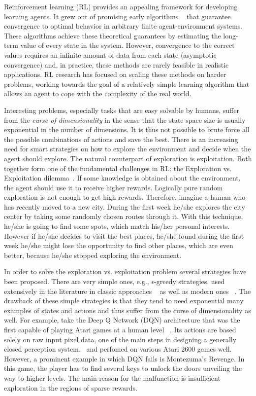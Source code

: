 Reinforcement learning (RL) provides an appealing framework for developing learning agents. It grew out of promising early algorithms ~\cite{Watkins:89,rummery:cuedtr94} that guarantee convergence to optimal behavior in arbitrary finite agent-environment systems. These algorithms achieve these theoretical guarantees by estimating the long-term value of every state in the system. However, convergence to the correct values requires an infinite amount of data from each state (asymptotic convergence) and, in practice, these methods are rarely feasible in realistic applications. RL research has focused on scaling these methods on harder problems, working towards the goal of a relatively simple learning algorithm that allows an agent to cope with the complexity of the real world.\par
Interesting problems, especially tasks that are easy solvable by humans, suffer from the \emph{curse of dimensionality} in the sense that the state space size is usually exponential in the number of dimensions. It is thus not possible to brute force all the possible combinations of actions and save the best. There is an increasing need for smart strategies on how to explore the environment and decide when the agent should explore.
The natural counterpart of exploration is exploitation.  Both together form one of the fundamental challenges in RL: the Exploration vs. Exploitation dilemma~\cite{Sutton:1998:IRL:551283}. If some knowledge is obtained about the environment, the agent should use it to receive higher rewards. Logically pure random exploration is not enough to get high rewards. Therefore, imagine a human who has recently moved to a new city. During the first week he/she explores the city center by taking some randomly chosen routes through it. With this technique, he/she is going to find some spots, which match his/her personal interests. However if he/she decides to visit the best places, he/she found during the first week he/she might lose the opportunity to find other places, which are even better, because he/she stopped exploring the environment.\par
In order to solve the exploration vs. exploitation problem several strategies have been proposed. There are very simple ones, e.g., $\epsilon$-greedy strategies, used extensively in the literature in classic approaches ~\cite{Watkins:89,rummery:cuedtr94} as well as modern ones ~\cite{mnih2015humanlevel,DBLP:journals/corr/OsbandBPR16}. The drawback of these simple strategies is that they tend to need exponential many examples of states and actions and thus suffer from the curse of dimensionality as well. For example, take the Deep Q Network (DQN) architecture that was the first capable of playing Atari games at a human level ~\cite{mnih2015humanlevel}. Its actions are based solely on raw input pixel data, one of the main steps in designing a generally closed perception system.~\cite{mnih2015humanlevel} and perfomed on various Atari 2600 games well. However, a prominent example in which DQN fails is Montezuma’s Revenge. In this game, the player has to find several keys to unlock the doors unveiling the way to higher levels. The main reason for the malfunction is insufficient exploration in the regions of sparse rewards.\par
